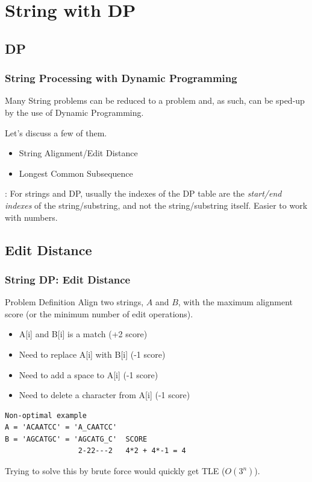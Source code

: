 \documentclass{beamer}
\begin{document}
\section{String with DP} %
\subsection{DP}
\begin{frame}
  \frametitle{String Processing with Dynamic Programming}
  {\smaller
  \begin{block}{}
    Many String problems can be reduced to a 
    problem and, as such, can be sped-up by the use of Dynamic
    Programming.
    
    \bigskip

    Let's discuss a few of them.
  \end{block}

  \begin{itemize}
  \item String Alignment/Edit Distance
  \item Longest Common Subsequence
  \end{itemize}

  \bigskip

  : For strings and DP, usually the indexes of the DP
  table are the \emph{start/end indexes} of the string/substring, and
  not the string/substring itself. Easier to work with numbers.}
\end{frame}

\subsection{Edit Distance}
\begin{frame}[fragile]
  \frametitle{String DP: Edit Distance}
  {\smaller
  \begin{block}{Problem Definition}
    Align two strings, $A$ and $B$, with the maximum alignment score
    (or the minimum number of edit operations).

    \begin{itemize}
    \item A[i] and B[i] is a match (+2 score)
    \item Need to replace A[i] with B[i] (-1 score)
    \item Need to add a space to A[i] (-1 score)
    \item Need to delete a character from A[i] (-1 score)
    \end{itemize}
  \end{block}

\begin{verbatim}
Non-optimal example
A = 'ACAATCC' = 'A_CAATCC'
B = 'AGCATGC' = 'AGCATG_C'  SCORE
                 2-22---2   4*2 + 4*-1 = 4
\end{verbatim}

Trying to solve this by brute force would quickly get TLE ($O(3^n)$).

  }
\end{frame}
\end{document}

